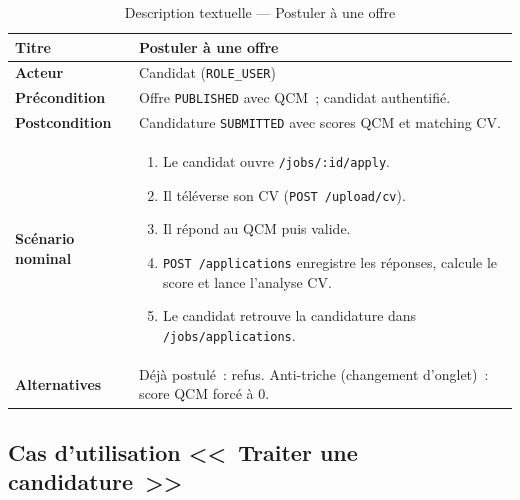 \begin{table}[htbp]
  \centering
  \small
  \caption{Description textuelle --- Postuler à une offre}
  \label{tab:uc-apply}
  \begin{tabular}{|p{3.0cm}|p{10.2cm}|}
    \hline
    \textbf{Titre} & Postuler à une offre \\
    \hline
    \textbf{Acteur} & Candidat (\texttt{ROLE\_USER}) \\
    \hline
    \textbf{Précondition} & Offre \texttt{PUBLISHED} avec QCM~; candidat authentifié. \\
    \hline
    \textbf{Postcondition} & Candidature \texttt{SUBMITTED} avec scores QCM et matching CV. \\
    \hline
    \textbf{Scénario nominal}
    &
    \begin{enumerate}[leftmargin=*,itemsep=0.15em,topsep=0.2em]
      \item Le candidat ouvre \texttt{/jobs/:id/apply}.
      \item Il téléverse son CV (\texttt{POST /upload/cv}).
      \item Il répond au QCM puis valide.
      \item \texttt{POST /applications} enregistre les réponses, calcule
            le score et lance l'analyse CV.
      \item Le candidat retrouve la candidature dans
            \texttt{/jobs/applications}.
    \end{enumerate}
    \\
    \hline
    \textbf{Alternatives}
    & Déjà postulé~: refus. Anti-triche (changement d'onglet)~: score QCM forcé à 0. \\
    \hline
  \end{tabular}
\end{table}


\subsection{Cas d'utilisation <<~Traiter une candidature~>>}

